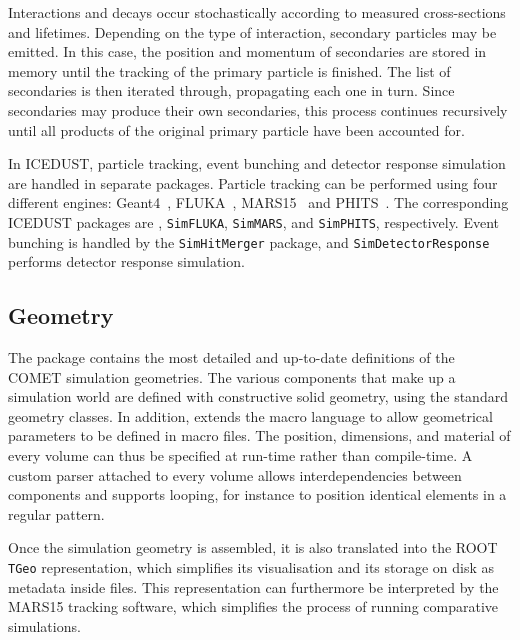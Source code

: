 Interactions and decays occur stochastically according to measured cross-sections and lifetimes. Depending on the type of interaction, secondary particles may be emitted. In this case, the position and momentum of secondaries are stored in memory until the tracking of the primary particle is finished. The list of secondaries is then iterated through, propagating each one in turn. Since secondaries may produce their own secondaries, this process continues recursively until all products of the original primary particle have been accounted for.

In ICEDUST, particle tracking, event bunching and detector response simulation are handled in separate packages.
Particle tracking can be performed using four different engines: Geant4~\cite{AGOSTINELLI2003250}, FLUKA~\cite{FLUKA}, MARS15~\cite{MARS15} and PHITS~\cite{PHITS}. The corresponding ICEDUST packages are \SimG, \texttt{SimFLUKA}, \texttt{SimMARS}, and \texttt{SimPHITS}, respectively.
Event bunching is handled by the \texttt{SimHitMerger} package, and \texttt{SimDetectorResponse} performs detector response simulation.

\subsection{Geometry}
The \SimG package contains the most detailed and up-to-date definitions of the COMET simulation geometries.
The various components that make up a simulation world are defined with constructive solid geometry, using the standard \Geant geometry classes. In addition, \SimG extends the \Geant macro language to allow geometrical parameters to be defined in macro files. The position, dimensions, and material of every volume can thus be specified at run-time rather than compile-time. A custom parser attached to every volume allows interdependencies between components and supports looping, for instance to position identical elements in a regular pattern.

Once the simulation geometry is assembled, it is also translated into the ROOT \texttt{TGeo} representation, which simplifies its visualisation and its storage on disk as metadata inside \oaEvent files. This representation can furthermore be interpreted by the MARS15 tracking software, which simplifies the process of running comparative simulations.



